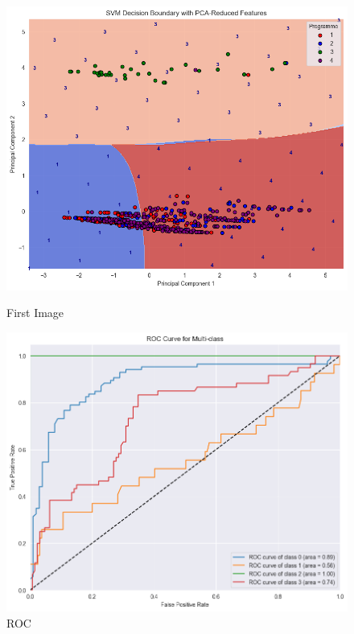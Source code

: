 \documentclass[twocolumn]{IEEEtran}
\begin{document}


\begin{figure}[H]
    \centering
    \begin{minipage}{0.23\textwidth}
        \centering
        \includegraphics[width=\linewidth]{./img/decision_boundary.png}
        \caption{First Image}
        \label{SVM Decision Boundary}
    \end{minipage}
    \begin{minipage}{0.23\textwidth}
        \centering
        \includegraphics[width=\linewidth]{./img/ROC.png}
        \caption{ROC}
        \label{fig:sub2}
    \end{minipage}
\end{figure}
\end{document}
